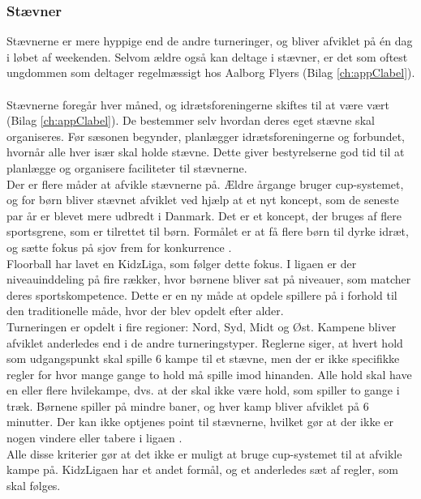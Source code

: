 \subsubsection{Stævner}\label{staevner}
Stævnerne er mere hyppige end de andre turneringer, og bliver afviklet på én dag i løbet af weekenden. Selvom ældre også kan deltage i stævner, er det som oftest ungdommen som deltager regelmæssigt hos Aalborg Flyers (Bilag \ref{ch:appClabel}).
\\\\
Stævnerne foregår hver måned, og idrætsforeningerne skiftes til at være vært (Bilag \ref{ch:appClabel}). De bestemmer selv hvordan deres eget stævne skal organiseres. Før sæsonen begynder, planlægger idrætsforeningerne og forbundet, hvornår alle hver især skal holde stævne. Dette giver bestyrelserne god tid til at planlægge og organisere faciliteter til stævnerne. 
\\
Der er flere måder at afvikle stævnerne på. Ældre årgange bruger cup-systemet, og for børn bliver stævnet afviklet ved hjælp at et nyt koncept, som de seneste par år er blevet mere udbredt i Danmark. Det er et koncept, der bruges af flere sportsgrene, som er tilrettet til børn. Formålet er at få flere børn til dyrke idræt, og sætte fokus på sjov frem for konkurrence \citep{kidzRegler}.\\
Floorball har lavet en KidzLiga, som følger dette fokus. I ligaen er der niveauinddeling på fire rækker, hvor børnene bliver sat på niveauer, som matcher deres sportskompetence. Dette er en ny måde at opdele spillere på i forhold til den traditionelle måde, hvor der blev opdelt efter alder.\\
Turneringen er opdelt i fire regioner: Nord, Syd, Midt og Øst. Kampene bliver afviklet anderledes end i de andre turneringstyper. Reglerne siger, at hvert hold som udgangspunkt skal spille 6 kampe til et stævne, men der er ikke specifikke regler for hvor mange gange to hold må spille imod hinanden. Alle hold skal have en eller flere hvilekampe, dvs. at der skal ikke være hold, som spiller to gange i træk. Børnene spiller på mindre baner, og hver kamp bliver afviklet på 6 minutter. Der kan ikke optjenes point til stævnerne, hvilket gør at der ikke er nogen vindere eller tabere i ligaen \citep{kidzRegler}.\\
Alle disse kriterier gør at det ikke er muligt at bruge cup-systemet til at afvikle kampe på. KidzLigaen har et andet formål, og et anderledes sæt af regler, som skal følges.

